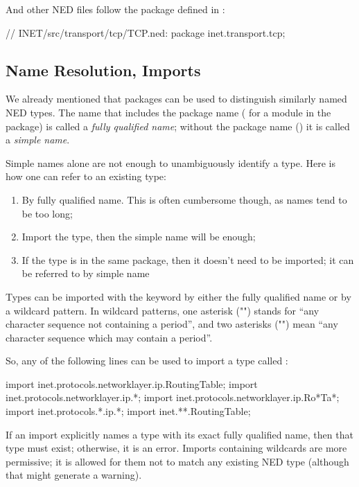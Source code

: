 And other NED files follow the package defined in :

\begin{ned}
// INET/src/transport/tcp/TCP.ned:
package inet.transport.tcp;
\end{ned}


\subsection{Name Resolution, Imports}
\label{sec:ned-lang:imports-and-name-resolution}

We already mentioned that packages can be used to distinguish similarly named
NED types. The name that includes the package name ( for a
 module in the  package) is called a \textit{fully
qualified name}; without the package name () it is called a
\textit{simple name}.

Simple names alone are not enough to unambiguously identify a type. Here is how
one can refer to an existing type:

\begin{enumerate}
  \item By fully qualified name. This is often cumbersome though, as names tend to be too long;
  \item Import the type, then the simple name will be enough;
  \item If the type is in the same package, then it doesn't need to be imported;
    it can be referred to by simple name
\end{enumerate}

Types can be imported with the  keyword by either the fully
qualified name or by a wildcard pattern. In wildcard patterns, one asterisk
("\ttt{*}") stands for ``any character sequence not containing a period'', and two
asterisks ("\ttt{**}") mean ``any character sequence which may contain a period''.

So, any of the following lines can be used to import a type called
:

\begin{ned}
import inet.protocols.networklayer.ip.RoutingTable;
import inet.protocols.networklayer.ip.*;
import inet.protocols.networklayer.ip.Ro*Ta*;
import inet.protocols.*.ip.*;
import inet.**.RoutingTable;
\end{ned}

If an import explicitly names a type with its exact fully qualified name, then
that type must exist; otherwise, it is an error. Imports containing wildcards
are more permissive; it is allowed for them not to match any existing NED type
(although that might generate a warning).

